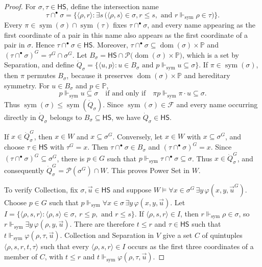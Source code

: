 \documentclass[11pt,a4paper]{amsart}
\newcommand{\HS}{\mathsf{HS}}
\newcommand{\sym}{\operatorname{sym}}
\newcommand{\forcesS}{\Vdash_{\mathrm{sym}}}
\theoremstyle{plain}
\theoremstyle{definition}
\theoremstyle{remark}
\begin{document}
\begin{proof}
For $\sigma,\tau\in\HS$, define the intersection name
\[
\tau\cap^\bullet\sigma=\bigl\{\langle\rho,r\rangle:\exists s\,\bigl(\langle\rho,s\rangle\in\sigma, r\leq s,
\text{ and }r\forcesS\rho\in\tau\bigr)\bigr\}.
\]
Every $\pi\in\sym(\sigma)\cap\sym(\tau)$ fixes $\tau\cap^\bullet\sigma$, and every name appearing as the first coordinate of a pair in this name also appears as the first coordinate of a pair in $\sigma$.  Hence $\tau\cap^\bullet\sigma\in\HS$.  Moreover, $\tau\cap^\bullet\sigma\subseteq \operatorname{dom}(\sigma)\times\mathbb P$ and $(\tau\cap^\bullet\sigma)^G=\tau^G\cap\sigma^G$.  Let $B_\sigma=\HS\cap\mathcal P\bigl(\operatorname{dom}(\sigma)\times\mathbb P\bigr)$, which is a set by Separation, and define $\dot Q_\sigma=\bigl\{\langle u,p\rangle:u\in B_\sigma\text{ and }p\forcesS u\subseteq\sigma\bigr\}$.
If $\pi\in\sym(\sigma)$, then $\pi$ permutes $B_\sigma$, because it preserves $\operatorname{dom}(\sigma)\times\mathbb P$ and hereditary symmetry.  For $u\in B_\sigma$ and $p\in\mathbb P$,
\[
p\forcesS u\subseteq\sigma
\quad\text{if and only if}\quad
\pi p\forcesS\pi\cdot u\subseteq\sigma.
\]
Thus $\sym(\sigma)\leq\sym(\dot Q_\sigma)$.  Since $\sym(\sigma)\in\mathcal F$ and every name occurring directly in $\dot Q_\sigma$ belongs to $B_\sigma\subseteq\HS$, we have $\dot Q_\sigma\in\HS$.

If $x\in\dot Q_\sigma^G$, then $x\in W$ and $x\subseteq\sigma^G$.  Conversely, let $x\in W$ with $x\subseteq\sigma^G$, and choose $\tau\in\HS$ with $\tau^G=x$.  Then $\tau\cap^\bullet\sigma\in B_\sigma$ and $(\tau\cap^\bullet\sigma)^G=x$.  Since $(\tau\cap^\bullet\sigma)^G\subseteq\sigma^G$, there is $p\in G$ such that $p\forcesS\tau\cap^\bullet\sigma\subseteq\sigma$.  Thus $x\in\dot Q_\sigma^G$, and consequently $\dot Q_\sigma^G=\mathcal P(\sigma^G)\cap W$.
This proves Power Set in $W$.

To verify Collection, fix $\sigma,\vec u\in\HS$ and suppose $W\models\forall x\in\sigma^G\,\exists y\,\varphi(x,y,\vec u^G)$.  Choose $p\in G$ such that $p\forcesS\forall x\in\sigma\,\exists y\,\varphi(x,y,\vec u)$.  Let $I=\bigl\{\langle\rho,s,r\rangle:\langle\rho,s\rangle\in\sigma,\ r\leq p,\text{ and }r\leq s\bigr\}$.  If $\langle\rho,s,r\rangle\in I$, then $r\forcesS\rho\in\sigma$, so $r\forcesS\exists y\,\varphi(\rho,y,\vec u)$.  There are therefore $t\leq r$ and $\tau\in\HS$ such that $t\forcesS\varphi(\rho,\tau,\vec u)$.  Collection and Separation in $V$ give a set $C$ of quintuples $\langle\rho,s,r,t,\tau\rangle$ such that every $\langle\rho,s,r\rangle\in I$ occurs as the first three coordinates of a member of $C$, with $t\leq r$ and $t\forcesS\varphi(\rho,\tau,\vec u)$.


\end{proof}
\end{document}
